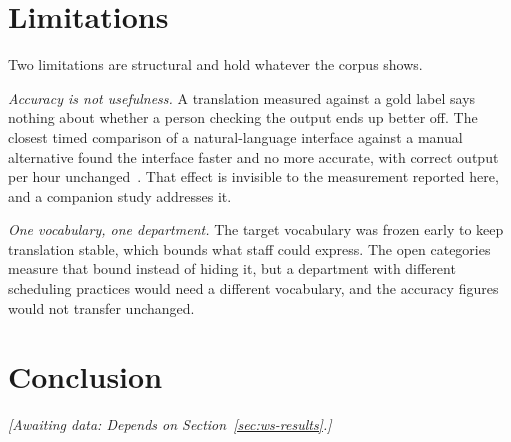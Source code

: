 \documentclass[sigconf,screen,review,anonymous]{acmart}
\newcommand{\awaitingdata}[1]{%
  \par\noindent\textit{[Awaiting data: #1]}\par}
\begin{document}
\section{Limitations}

Two limitations are structural and hold whatever the corpus shows.

\emph{Accuracy is not usefulness.} A translation measured against a gold label
says nothing about whether a person checking the output ends up better off.
The closest timed comparison of a natural-language interface against a manual
alternative found the interface faster and no more accurate, with correct
output per hour unchanged~\cite{ipeirotis2026nlidb}. That effect is invisible
to the measurement reported here, and a companion study addresses it.

\emph{One vocabulary, one department.} The target vocabulary was frozen early
to keep translation stable, which bounds what staff could express. The open
categories measure that bound instead of hiding it, but a department with
different scheduling practices would need a different vocabulary, and the
accuracy figures would not transfer unchanged.

\section{Conclusion}
\awaitingdata{Depends on Section~\ref{sec:ws-results}.}



\end{document}
